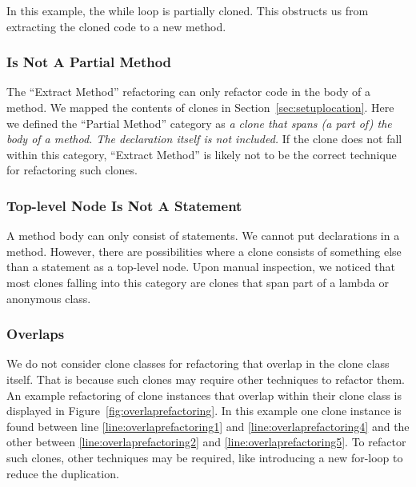 In this example, the while loop is partially cloned. This obstructs us from extracting the cloned code to a new method.

\subsubsection{Is Not A Partial Method}
The ``Extract Method'' refactoring can only refactor code in the body of a method. We mapped the contents of clones in Section~\ref{sec:setuplocation}. Here we defined the ``Partial Method'' category as \textit{a clone that spans (a part of) the body of a method. The declaration itself is not included.} If the clone does not fall within this category, ``Extract Method'' is likely not to be the correct technique for refactoring such clones.

\subsubsection{Top-level Node Is Not A Statement}
A method body can only consist of statements. We cannot put declarations in a method. However, there are possibilities where a clone consists of something else than a statement as a top-level node. Upon manual inspection, we noticed that most clones falling into this category are clones that span part of a lambda or anonymous class.

\subsubsection{Overlaps}
We do not consider clone classes for refactoring that overlap in the clone class itself. That is because such clones may require other techniques to refactor them. An example refactoring of clone instances that overlap within their clone class is displayed in Figure~\ref{fig:overlaprefactoring}. In this example one clone instance is found between line \ref{line:overlaprefactoring1} and \ref{line:overlaprefactoring4} and the other between \ref{line:overlaprefactoring2} and \ref{line:overlaprefactoring5}. To refactor such clones, other techniques may be required, like introducing a new for-loop to reduce the duplication.

